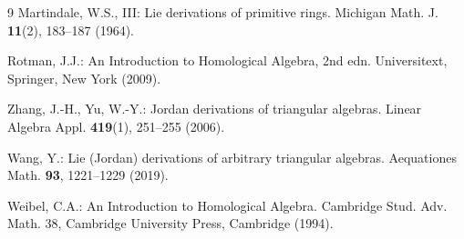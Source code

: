 \documentclass[]{interact}
\theoremstyle{plain}
\theoremstyle{definition}
\theoremstyle{remark}
\begin{document}
\begin{thebibliography}{9}
Martindale, W.S., III: Lie derivations of primitive rings. Michigan Math. J. \textbf{11}(2), 183--187 (1964).

Rotman, J.J.: An Introduction to Homological Algebra, 2nd edn. Universitext, Springer, New York (2009).

Zhang, J.-H., Yu, W.-Y.: Jordan derivations of triangular algebras. Linear Algebra Appl. \textbf{419}(1), 251--255 (2006).

Wang, Y.: Lie (Jordan) derivations of arbitrary triangular algebras. Aequationes Math. \textbf{93}, 1221--1229 (2019).

Weibel, C.A.: An Introduction to Homological Algebra. Cambridge Stud. Adv. Math. 38, Cambridge University Press, Cambridge (1994).

\end{thebibliography}
\end{document}
